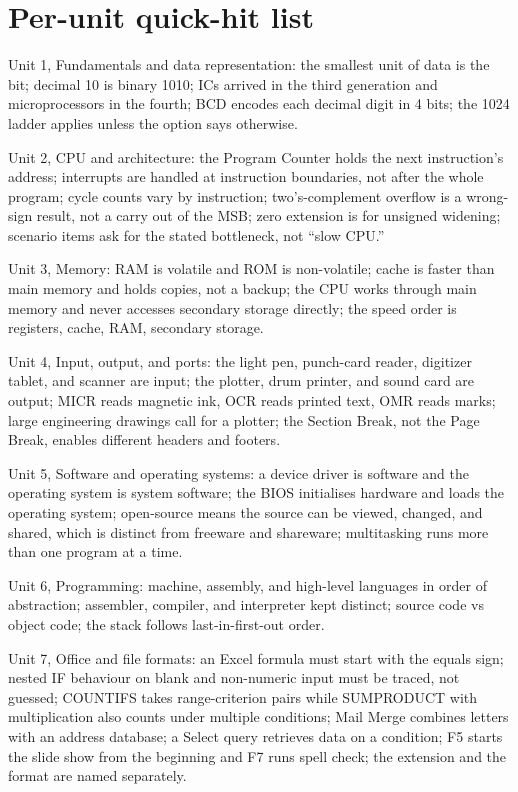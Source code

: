 \documentclass[11pt]{article}
\begin{document}
\section{Per-unit quick-hit list}
Unit 1, Fundamentals and data representation: the smallest unit of data is
the bit; decimal 10 is binary 1010; ICs arrived in the third generation and
microprocessors in the fourth; BCD encodes each decimal digit in 4 bits; the
1024 ladder applies unless the option says otherwise.

Unit 2, CPU and architecture: the Program Counter holds the next
instruction's address; interrupts are handled at instruction boundaries, not
after the whole program; cycle counts vary by instruction; two's-complement
overflow is a wrong-sign result, not a carry out of the MSB; zero extension
is for unsigned widening; scenario items ask for the stated bottleneck, not
``slow CPU.''

Unit 3, Memory: RAM is volatile and ROM is non-volatile; cache is faster
than main memory and holds copies, not a backup; the CPU works through main
memory and never accesses secondary storage directly; the speed order is
registers, cache, RAM, secondary storage.

Unit 4, Input, output, and ports: the light pen, punch-card reader,
digitizer tablet, and scanner are input; the plotter, drum printer, and
sound card are output; MICR reads magnetic ink, OCR reads printed text, OMR
reads marks; large engineering drawings call for a plotter; the Section
Break, not the Page Break, enables different headers and footers.

Unit 5, Software and operating systems: a device driver is software and the
operating system is system software; the BIOS initialises hardware and loads
the operating system; open-source means the source can be viewed, changed,
and shared, which is distinct from freeware and shareware; multitasking runs
more than one program at a time.

Unit 6, Programming: machine, assembly, and high-level languages in order of
abstraction; assembler, compiler, and interpreter kept distinct; source code
vs object code; the stack follows last-in-first-out order.

Unit 7, Office and file formats: an Excel formula must start with the equals
sign; nested IF behaviour on blank and non-numeric input must be traced, not
guessed; COUNTIFS takes range-criterion pairs while SUMPRODUCT with
multiplication also counts under multiple conditions; Mail Merge combines
letters with an address database; a Select query retrieves data on a
condition; F5 starts the slide show from the beginning and F7 runs spell
check; the extension and the format are named separately.
\end{document}
